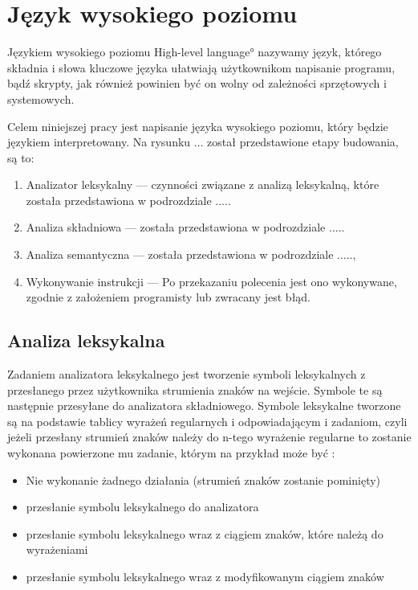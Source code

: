 \section{Język wysokiego poziomu }

Językiem wysokiego poziomu \ang{High-level language} nazywamy język, 
którego składnia i słowa kluczowe języka ułatwiają użytkownikom  napisanie programu, bądź skrypty,
jak również powinien być on wolny od zależności sprzętowych i systemowych.

Celem niniejszej pracy jest napisanie języka wysokiego poziomu, który będzie językiem interpretowany.
Na rysunku ... został przedstawione etapy budowania, są to:
\begin{enumerate}
 \item Analizator leksykalny --- czynności związane z analizą leksykalną, które  została przedstawiona w podrozdziale   .....
 \item Analiza składniowa  ---  została przedstawiona w podrozdziale   .....
 \item Analiza semantyczna ---  została przedstawiona w podrozdziale   .....,
 \item Wykonywanie instrukcji --- Po przekazaniu polecenia jest ono wykonywane, zgodnie z założeniem programisty lub zwracany jest błąd.
\end{enumerate}
 


\subsection{Analiza leksykalna}

Zadaniem analizatora leksykalnego jest tworzenie symboli leksykalnych 
z przesłanego przez użytkownika strumienia znaków na wejście. 
Symbole te są następnie przesyłane  do analizatora składniowego. 
Symbole leksykalne tworzone są na podstawie tablicy wyrażeń regularnych i odpowiadającym i zadaniom,
czyli jeżeli przesłany strumień znaków należy do  n-tego wyrażenie regularne
 to zostanie wykonana powierzone mu zadanie, 
 którym na przykład
 może być \cite{aho}:
\begin{itemize}
 \item Nie wykonanie żadnego działania (strumień znaków zostanie pominięty)
 \item przesłanie symbolu leksykalnego do analizatora
 \item przesłanie symbolu leksykalnego wraz z ciągiem znaków, które należą do wyrażeniami
 \item przesłanie symbolu leksykalnego wraz z modyfikowanym ciągiem znaków
\end{itemize}


